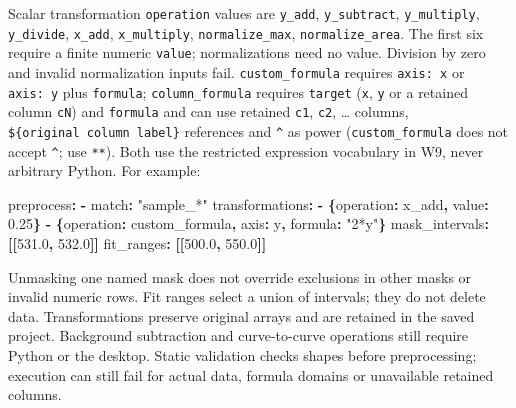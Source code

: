 \documentclass[
  10pt,
  a4paper,
  oneside]{scrreprt}
\newenvironment{Shaded}{}{}
\newcommand{\AttributeTok}[1]{\textcolor[rgb]{0.49,0.56,0.16}{#1}}
\newcommand{\CharTok}[1]{\textcolor[rgb]{0.25,0.44,0.63}{#1}}
\newcommand{\FloatTok}[1]{\textcolor[rgb]{0.25,0.63,0.44}{#1}}
\newcommand{\FunctionTok}[1]{\textcolor[rgb]{0.02,0.16,0.49}{#1}}
\newcommand{\KeywordTok}[1]{\textcolor[rgb]{0.00,0.44,0.13}{\textbf{#1}}}
\newcommand{\StringTok}[1]{\textcolor[rgb]{0.25,0.44,0.63}{#1}}
\begin{document}
Scalar transformation \texttt{operation} values are \texttt{y\_add},
\texttt{y\_subtract}, \texttt{y\_multiply}, \texttt{y\_divide},
\texttt{x\_add}, \texttt{x\_multiply}, \texttt{normalize\_max},
\texttt{normalize\_area}. The first six require a finite numeric
\texttt{value}; normalizations need no value. Division by zero and
invalid normalization inputs fail. \texttt{custom\_formula} requires
\texttt{axis:\ x} or \texttt{axis:\ y} plus \texttt{formula};
\texttt{column\_formula} requires \texttt{target} (\texttt{x},
\texttt{y} or a retained column \texttt{cN}) and \texttt{formula} and
can use retained \texttt{c1}, \texttt{c2}, \ldots{} columns,
\texttt{\$\{original\ column\ label\}} references and \texttt{\^{}} as
power (\texttt{custom\_formula} does not accept \texttt{\^{}}; use
\texttt{**}). Both use the restricted expression vocabulary in W9, never
arbitrary Python. For example:

\begin{Shaded}
\begin{Highlighting}[]
\FunctionTok{preprocess}\KeywordTok{:}
\AttributeTok{  }\KeywordTok{{-}}\AttributeTok{ }\FunctionTok{match}\KeywordTok{:}\AttributeTok{ }\StringTok{"sample\_*"}
\AttributeTok{    }\FunctionTok{transformations}\KeywordTok{:}
\AttributeTok{      }\KeywordTok{{-}}\AttributeTok{ }\KeywordTok{\{}\FunctionTok{operation}\KeywordTok{:}\AttributeTok{ x\_add}\KeywordTok{,}\AttributeTok{ }\FunctionTok{value}\KeywordTok{:}\AttributeTok{ }\FloatTok{0.25}\KeywordTok{\}}
\AttributeTok{      }\KeywordTok{{-}}\AttributeTok{ }\KeywordTok{\{}\FunctionTok{operation}\KeywordTok{:}\AttributeTok{ custom\_formula}\KeywordTok{,}\AttributeTok{ }\FunctionTok{axis}\KeywordTok{:}\AttributeTok{ }\CharTok{y}\KeywordTok{,}\AttributeTok{ }\FunctionTok{formula}\KeywordTok{:}\AttributeTok{ }\StringTok{"2*y"}\KeywordTok{\}}
\AttributeTok{    }\FunctionTok{mask\_intervals}\KeywordTok{:}\AttributeTok{ }\KeywordTok{[[}\FloatTok{531.0}\KeywordTok{,}\AttributeTok{ }\FloatTok{532.0}\KeywordTok{]]}
\AttributeTok{    }\FunctionTok{fit\_ranges}\KeywordTok{:}\AttributeTok{ }\KeywordTok{[[}\FloatTok{500.0}\KeywordTok{,}\AttributeTok{ }\FloatTok{550.0}\KeywordTok{]]}
\end{Highlighting}
\end{Shaded}

Unmasking one named mask does not override exclusions in other masks or
invalid numeric rows. Fit ranges select a union of intervals; they do
not delete data. Transformations preserve original arrays and are
retained in the saved project. Background subtraction and curve-to-curve
operations still require Python or the desktop. Static validation checks
shapes before preprocessing; execution can still fail for actual data,
formula domains or unavailable retained columns.
\end{document}
